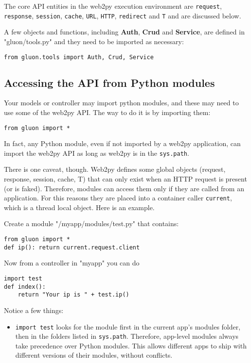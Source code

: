\documentclass[justified,sixbynine,notoc]{tufte-book}
\def\ft{\small\tt}
\begin{document}
\begin{fullwidth}
The core API entities in the web2py execution environment are {\ft request}, {\ft response}, {\ft session}, {\ft cache}, {\ft URL}, {\ft HTTP}, {\ft redirect} and {\ft T} and are discussed below.

A few objects and functions, including {\bf Auth}, {\bf Crud} and {\bf Service}, are defined in "gluon/tools.py" and they need to be imported as necessary:
\begin{lstlisting}
from gluon.tools import Auth, Crud, Service
\end{lstlisting}

\goodbreak\subsection{Accessing the API from Python modules}

Your models or controller may import python modules, and these may need to use some of the web2py API. The way to do it is by importing them:

\begin{lstlisting}
from gluon import *
\end{lstlisting}

In fact, any Python module, even if not imported by a web2py application, can import the web2py API as long as web2py is in the {\ft sys.path}.

There is one caveat, though. Web2py defines some global objects (request, response, session, cache, T) that can only exist when an HTTP request is present (or is faked). Therefore, modules can access them only if they are called from an application. For this reasons they are placed into a container caller {\ft current}, which is a thread local object. Here is an example.

Create a module "/myapp/modules/test.py" that contains:
\begin{lstlisting}
from gluon import *
def ip(): return current.request.client
\end{lstlisting}
Now from a controller in "myapp" you can do
\begin{lstlisting}
import test
def index():
    return "Your ip is " + test.ip()
\end{lstlisting}

Notice a few things:

\begin{itemize}
\item {\ft import test} looks for the module first in the current app's modules folder, then in the folders listed in {\ft sys.path}. Therefore, app-level modules always take precedence over Python modules. This allows different apps to ship with different versions of their modules, without conflicts.


\end{itemize}
\end{fullwidth}
\end{document}
